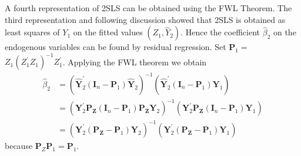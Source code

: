 \documentclass[10pt]{article}
\begin{document}
A fourth representation of 2SLS can be obtained using the FWL Theorem. The third representation and following discussion showed that 2SLS is obtained as least squares of $Y_{1}$ on the fitted values $\left(Z_{1}, \widehat{Y}_{2}\right)$. Hence the coefficient $\widehat{\beta}_{2}$ on the endogenous variables can be found by residual regression. Set $\boldsymbol{P}_{1}=$ $Z_{1}\left(Z_{1}^{\prime} Z_{1}\right)^{-1} Z_{1}^{\prime}$. Applying the FWL theorem we obtain
$$
\begin{aligned}
\widehat{\beta}_{2} &=\left(\widehat{\boldsymbol{Y}}_{2}^{\prime}\left(\boldsymbol{I}_{n}-\boldsymbol{P}_{1}\right) \widehat{\boldsymbol{Y}}_{2}\right)^{-1}\left(\widehat{\boldsymbol{Y}}_{2}^{\prime}\left(\boldsymbol{I}_{n}-\boldsymbol{P}_{1}\right) \boldsymbol{Y}_{1}\right) \\
&=\left(\boldsymbol{Y}_{2}^{\prime} \boldsymbol{P}_{\boldsymbol{Z}}\left(\boldsymbol{I}_{n}-\boldsymbol{P}_{1}\right) \boldsymbol{P}_{\boldsymbol{Z}} \boldsymbol{Y}_{2}\right)^{-1}\left(\boldsymbol{Y}_{2}^{\prime} \boldsymbol{P}_{\boldsymbol{Z}}\left(\boldsymbol{I}_{n}-\boldsymbol{P}_{1}\right) \boldsymbol{Y}_{1}\right) \\
&=\left(\boldsymbol{Y}_{2}^{\prime}\left(\boldsymbol{P}_{\boldsymbol{Z}}-\boldsymbol{P}_{1}\right) \boldsymbol{Y}_{2}\right)^{-1}\left(\boldsymbol{Y}_{2}^{\prime}\left(\boldsymbol{P}_{\boldsymbol{Z}}-\boldsymbol{P}_{1}\right) \boldsymbol{Y}_{1}\right)
\end{aligned}
$$
because $\boldsymbol{P}_{Z} \boldsymbol{P}_{1}=\boldsymbol{P}_{1}$.
\end{document}

